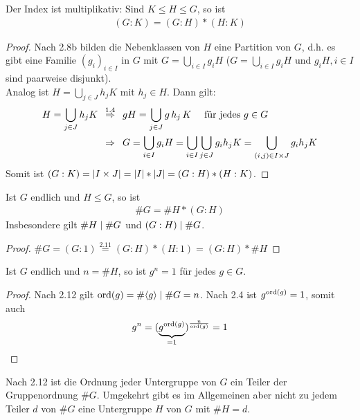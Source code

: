 \begin{satz}
	Der Index ist multiplikativ: Sind $K \leq H \leq G$, so ist 
	\begin{align*}
		(G:K) = (G:H) * (H:K)
	\end{align*}
\end{satz}
\begin{proof}
	Nach 2.8b bilden die Nebenklassen von $H$ eine Partition von $G$, d.h. es gibt eine Familie $(g_i)_{i \in I}$ in $G$ mit $G = \bigcup \limits_{i \in I}{g_i H}$ ($G= \bigcup \limits_{i \in I}{g_i H}$ und $g_i H, i \in I$ sind paarweise disjunkt). \\
	Analog ist $H = \bigcup \limits_{j \in J}{h_j K}$ mit $h_j \in H$. Dann gilt: 
	\begin{align*}
		H = \bigcup\limits_{j \in J}{h_j K} &\overset{1.4}{\enspace \Rightarrow \enspace} gH = \bigcup\limits_{j \in J}{g \, h_j \, K} \quad \text{ für jedes } g \in G \\
		&\enspace \Rightarrow \enspace G = \bigcup \limits_{i \in I}{g_i H} = \bigcup \limits_{i \in I}{\bigcup\limits_{j \in J}{g_i h_j K}} = \bigcup \limits_{(i,j) \in I \times J}{g_i h_j K}
	\end{align*}
	Somit ist $(G:K) = \left| I \times J \right| = \left| I \right| * \left| J \right| = (G:H) * (H:K)$.
\end{proof}

\begin{kor} 
	Ist $G$ endlich und $H \leq G$, so ist
	\begin{align*}
		\# G = \# H * (G:H)
	\end{align*}
	Insbesondere gilt $\# H \mid \# G$ und $(G:H) \mid \# G$.
\end{kor}
\begin{proof}
	$\# G = (G:1) \overset{2.11}{=} (G:H) * (H:1) = (G:H) * \# H$
\end{proof}

\begin{kor}
	Ist $G$ endlich und $n = \# H$, so ist $g^n=1$ für jedes $g \in G$.
\end{kor}
\begin{proof}
	Nach 2.12 gilt $\operatorname{ord}(g) = \# \langle g \rangle \mid \# G = n$. Nach 2.4 ist $g^{\operatorname{ord}(g)}=1$, somit auch
	\begin{align*}
		g^n=(\underbrace{g^{\operatorname{ord}(g)}}_{=1})^{\frac{n}{\operatorname{ord}(g)}} =1
	\end{align*}
\end{proof}
\begin{bem}
	Nach 2.12 ist die Ordnung jeder Untergruppe von $G$ ein Teiler der Gruppenordnung $\# G$. Umgekehrt gibt es im Allgemeinen aber nicht zu jedem Teiler $d$ von $\# G$ eine Untergruppe $H$ von $G$ mit $\# H =d$.
\end{bem}